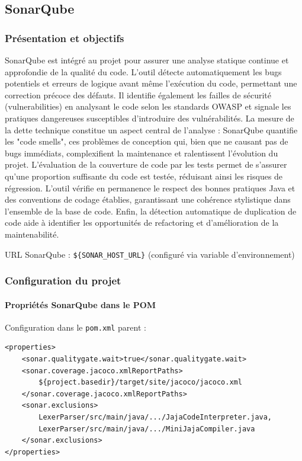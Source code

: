 \subsection{SonarQube}

\subsubsection{Présentation et objectifs}

SonarQube est intégré au projet pour assurer une analyse statique continue et approfondie de la qualité du code. L'outil détecte automatiquement les bugs potentiels et erreurs de logique avant même l'exécution du code, permettant une correction précoce des défauts. Il identifie également les failles de sécurité (vulnerabilities) en analysant le code selon les standards OWASP et signale les pratiques dangereuses susceptibles d'introduire des vulnérabilités. La mesure de la dette technique constitue un aspect central de l'analyse : SonarQube quantifie les "code smells", ces problèmes de conception qui, bien que ne causant pas de bugs immédiats, complexifient la maintenance et ralentissent l'évolution du projet. L'évaluation de la couverture de code par les tests permet de s'assurer qu'une proportion suffisante du code est testée, réduisant ainsi les risques de régression. L'outil vérifie en permanence le respect des bonnes pratiques Java et des conventions de codage établies, garantissant une cohérence stylistique dans l'ensemble de la base de code. Enfin, la détection automatique de duplication de code aide à identifier les opportunités de refactoring et d'amélioration de la maintenabilité.

URL SonarQube : \texttt{\$\{SONAR\_HOST\_URL\}} (configuré via variable d'environnement)

\subsubsection{Configuration du projet}

\paragraph{Propriétés SonarQube dans le POM}

Configuration dans le \texttt{pom.xml} parent :
\vspace{0.3cm}
\begin{lstlisting}[language=enhancedxml, caption=Configuration SonarQube]
<properties>
    <sonar.qualitygate.wait>true</sonar.qualitygate.wait>
    <sonar.coverage.jacoco.xmlReportPaths>
        ${project.basedir}/target/site/jacoco/jacoco.xml
    </sonar.coverage.jacoco.xmlReportPaths>
    <sonar.exclusions>
        LexerParser/src/main/java/.../JajaCodeInterpreter.java,
        LexerParser/src/main/java/.../MiniJajaCompiler.java
    </sonar.exclusions>
</properties>
\end{lstlisting}

